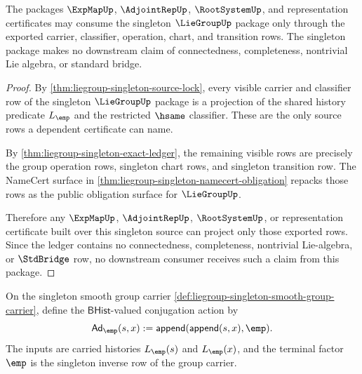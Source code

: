 \begin{theorem}
\label{thm:liegroup-singleton-downstream-export}
The packages $\ExpMapUp$, $\AdjointRepUp$, $\RootSystemUp$, and
representation certificates may consume the singleton $\LieGroupUp$ package
only through the exported carrier, classifier, operation, chart, and
transition rows. The singleton package makes no downstream claim of
connectedness, completeness, nontrivial Lie algebra, or standard bridge.
\end{theorem}
\begin{proof}
By \autoref{thm:liegroup-singleton-source-lock}, every visible carrier and
classifier row of the singleton $\LieGroupUp$ package is a projection of the
shared history predicate $L_{\emp}$ and the restricted $\hsame$ classifier.
These are the only source rows a dependent certificate can name.

By \autoref{thm:liegroup-singleton-exact-ledger}, the remaining visible rows
are precisely the group operation rows, singleton chart rows, and singleton
transition row. The NameCert surface in
\autoref{thm:liegroup-singleton-namecert-obligation} repacks those rows as the
public obligation surface for $\LieGroupUp$.

Therefore any $\ExpMapUp$, $\AdjointRepUp$, $\RootSystemUp$, or
representation certificate built over this singleton source can project only
those exported rows. Since the ledger contains no connectedness, completeness,
nontrivial Lie-algebra, or $\StdBridge$ row, no downstream consumer receives
such a claim from this package.
\end{proof}

\begin{definition}
\label{def:liegroup-singleton-conjugation-action}
On the singleton smooth group carrier
\autoref{def:liegroup-singleton-smooth-group-carrier}, define the
$\mathsf{BHist}$-valued conjugation action by
$$
\mathsf{Ad}_{\emp}(s,x):=
\mathsf{append}(\mathsf{append}(s,x),\emp).
$$
The inputs are carried histories $L_{\emp}(s)$ and $L_{\emp}(x)$, and the
terminal factor $\emp$ is the singleton inverse row of the group carrier.
\end{definition}

